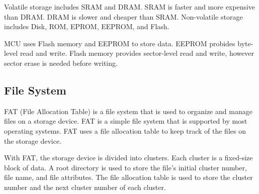 \documentclass[a4paper,12pt]{article}
\begin{document}
Volatile storage includes SRAM and DRAM. SRAM is faster and more expensive than DRAM. DRAM is slower and cheaper than SRAM. Non-volatile storage includes Disk, ROM, EPROM, EEPROM, and Flash.

MCU uses Flash memory and EEPROM to store data. EEPROM probides byte-level read and write. Flash memory provides sector-level read and write, however sector erase is needed before writing.

\subsection{File System}

FAT (File Allocation Table) is a file system that is used to organize and manage files on a storage device. FAT is a simple file system that is supported by most operating systems. FAT uses a file allocation table to keep track of the files on the storage device.

With FAT, the storage device is divided into clusters. Each cluster is a fixed-size block of data. A root directory is used to store the file's initial cluster number, file name, and file attributes. The file allocation table is used to store the cluster number and the next cluster number of each cluster.
\end{document}
